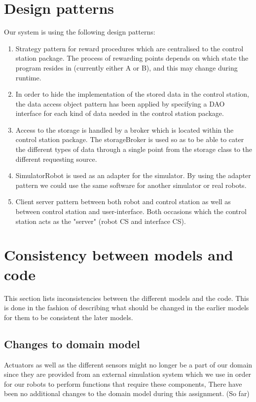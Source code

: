 \section{Design patterns}
Our system is using the following design patterns:
\begin{enumerate}
\item Strategy pattern for reward procedures which are centralised to the control station package. The process of rewarding points depends on which state the program resides in (currently either A or B), and this may change during runtime.
\item In order to hide the implementation of the stored data in the control station, the data access object pattern has been applied by specifying a DAO interface for each kind of data needed in the control station package.
\item Access to the storage is handled by a broker which is located within the control station package. The storageBroker is used so as to be able to cater the different types of data through a single point from the storage class to the different requesting source. 
\item SimulatorRobot is used as an adapter for the simulator. By using the adapter pattern we could use the same software for another simulator or real robots.
\item Client server pattern between both robot and control station as well as between control station and user-interface. Both occasions which the control station acts as the "server" (robot CS and interface CS).
\end{enumerate}

\section{Consistency between models and code}
This section lists inconsistencies between the different models and the code. This is done in the fashion of describing what should be changed in the earlier models for them to be consistent the later models.
\subsection{Changes to domain model}
Actuators as well as the different sensors might no longer be a part of our domain since they are provided from an external simulation system which we use in order for our robots to perform functions that require these components,
There have been no additional changes to the domain model during this assignment. (So far)

